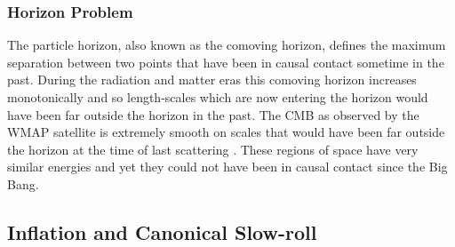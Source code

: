 \subsubsection{Horizon Problem} \label{sec:horizprob}
The particle horizon, also known
as the comoving horizon, defines the maximum separation between two points that
have been in causal contact sometime in the past. During the radiation and
matter eras this comoving horizon increases monotonically and so length-scales
which are now entering the horizon would have been far outside the horizon in
the past. 
The CMB as observed by the WMAP satellite is extremely smooth on scales that
would have been far outside the horizon at the time of last scattering
\cite{Komatsu:2008hk}. These regions of space have very similar energies and
yet they could not have been in causal contact since the Big Bang. 

% 
% 



\subsection{Inflation and Canonical Slow-roll}
\label{sec:slowroll-intro}

